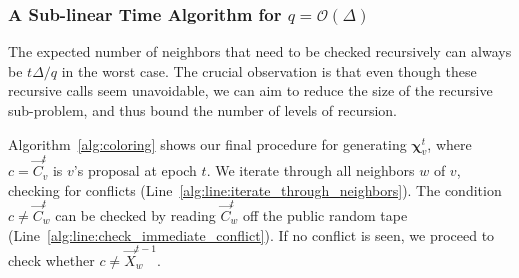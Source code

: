 \subsubsection{A Sub-linear Time Algorithm for $q = \mathcal O(\Delta)$}
\label{sec:jumping_back_to_past_epochs}
The expected number of neighbors that need to be checked recursively can always be $t\Delta/q$ in the worst case.
The crucial observation is that even though these recursive calls seem unavoidable,
we can aim to reduce the size of the recursive sub-problem, and thus bound the number of levels of recursion.

Algorithm~\ref{alg:coloring} shows our final procedure for generating $\bm\chi^t_v$, where $c =\vec C^t_v$ is $v$'s proposal at epoch $t$.
We iterate through all neighbors $w$ of $v$, checking for conflicts (Line~\ref{alg:line:iterate_through_neighbors}).
The condition $c\not=\vec C^t_w$ can be checked by reading $\vec C^t_w$ off the public random tape (Line~\ref{alg:line:check_immediate_conflict}).
If no conflict is seen, we proceed to check whether $c\not= \vec X^{t-1}_w$.

